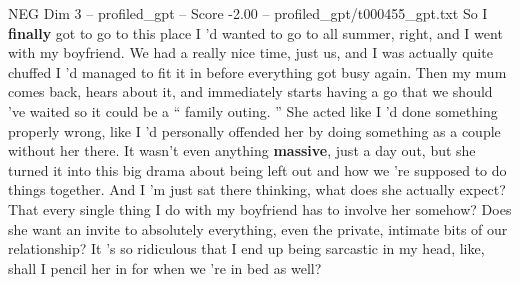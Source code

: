 \begin{textsample}{NEG Dim 3 – profiled\_gpt – Score -2.00 – profiled\_gpt/t000455\_gpt.txt}  \label{ex:f3_neg_025}
So I \textbf{finally} got to go to this place I ’d wanted to go to all summer, right, and I went with my boyfriend.
We had a really nice time, just us, and I was actually quite chuffed I ’d managed to fit it in before everything got busy again.
Then my mum comes back, hears about it, and immediately starts having a go that we should ’ve waited so it could be a “ family outing. ” She acted like I ’d done something properly wrong, like I ’d personally offended her by doing something as a couple without her there.
It wasn't even anything \textbf{massive}, just a day out, but she turned it into this big drama about being left out and how we ’re supposed to do things together.
And I ’m just sat there thinking, what does she actually expect?
That every single thing I do with my boyfriend has to involve her somehow?
Does she want an invite to absolutely everything, even the private, intimate bits of our relationship?
It ’s so ridiculous that I end up being sarcastic in my head, like, shall I pencil her in for when we ’re in bed as well?

\end{textsample}
